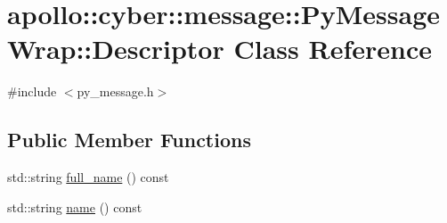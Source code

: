 \hypertarget{classapollo_1_1cyber_1_1message_1_1PyMessageWrap_1_1Descriptor}{\section{apollo\-:\-:cyber\-:\-:message\-:\-:Py\-Message\-Wrap\-:\-:Descriptor Class Reference}
\label{classapollo_1_1cyber_1_1message_1_1PyMessageWrap_1_1Descriptor}
}


{\ttfamily \#include $<$py\-\_\-message.\-h$>$}

\subsection*{Public Member Functions}
\begin{DoxyCompactItemize}
\item 
std\-::string \hyperlink{classapollo_1_1cyber_1_1message_1_1PyMessageWrap_1_1Descriptor_a3676d5f8e664604517960ceb69a995e4}{full\-\_\-name} () const 
\item 
std\-::string \hyperlink{classapollo_1_1cyber_1_1message_1_1PyMessageWrap_1_1Descriptor_a1a7460d7d8d5cc51eff5cc83c605d5cc}{name} () const 
\end{DoxyCompactItemize}


